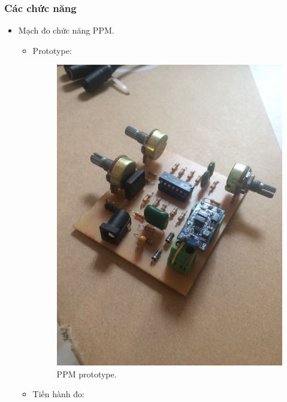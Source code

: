 \documentclass[a4paper,12pt,oneside]{article}
\begin{document}
\subsubsection{Các chức năng}
\begin{itemize}
	\item Mạch đo chức năng PPM.
		\begin{itemize}
\item Prototype:
	\begin{figure}[H]
	\begin{center}
	\includegraphics[scale=.6]{hinh/PPM/prototype_ppm.jpg}
	\end{center}
	\caption{PPM prototype.}
	\end{figure}
\item Tiến hành đo:
	\begin{figure}[H]
	\begin{center}

\end{center}
\end{figure}
\end{itemize}
\end{itemize}
\end{document}
